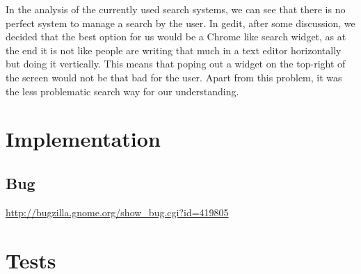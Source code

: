 
In the analysis of the currently used search systems, we can see that there is no perfect system to manage a search by the user. In gedit, after some discussion, we decided that the best option for us would be a Chrome like search widget, as at the end it is not like people are writing that much in a text editor horizontally but doing it vertically. This means that poping out a widget on the top-right of the screen would not be that bad for the user. Apart from this problem, it was the less problematic search way for our understanding.






\section{Implementation}

\subsection{Bug}

\url{http://bugzilla.gnome.org/show_bug.cgi?id=419805}

\section{Tests}

